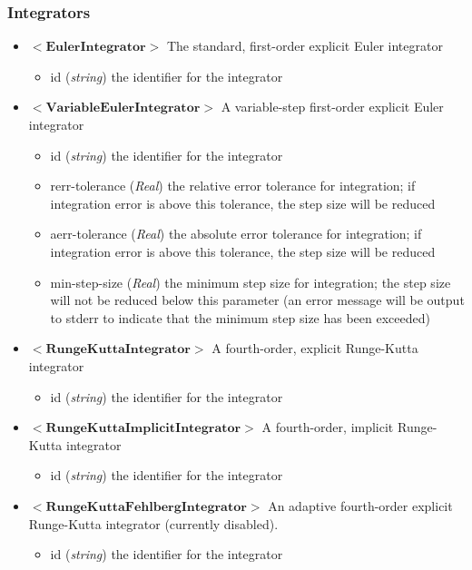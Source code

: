 \documentclass{article}
\begin{document}
\begin{landscape}
\subsubsection{Integrators}
\begin{itemize}
\item $<\textbf{EulerIntegrator}>$ The standard, first-order explicit Euler integrator
\begin{itemize}
\item id  (\emph{string}) the identifier for the integrator
\end{itemize} 
\item $<\textbf{VariableEulerIntegrator}>$ A variable-step first-order explicit Euler integrator
\begin{itemize}
\item id  (\emph{string}) the identifier for the integrator
\item rerr-tolerance (\emph{Real}) the relative error tolerance for integration; if integration error is above this tolerance, the step size will be reduced
\item aerr-tolerance (\emph{Real}) the absolute error tolerance for integration; if integration error is above this tolerance, the step size will be reduced
\item min-step-size (\emph{Real}) the minimum step size for integration; the step size will not be reduced below this parameter (an error message will be output to stderr to indicate that the minimum step size has been exceeded)
\end{itemize} 
\item $<\textbf{RungeKuttaIntegrator}>$ A fourth-order, explicit Runge-Kutta integrator
\begin{itemize}
\item id  (\emph{string}) the identifier for the integrator
\end{itemize} 
\item $<\textbf{RungeKuttaImplicitIntegrator}>$ A fourth-order, implicit Runge-Kutta integrator
\begin{itemize}
\item id  (\emph{string}) the identifier for the integrator
\end{itemize} 
\item $<\textbf{RungeKuttaFehlbergIntegrator}>$ An adaptive fourth-order explicit Runge-Kutta integrator (currently disabled).
\begin{itemize}
\item id  (\emph{string}) the identifier for the integrator

\end{itemize}
\end{itemize}
\end{landscape}
\end{document}

